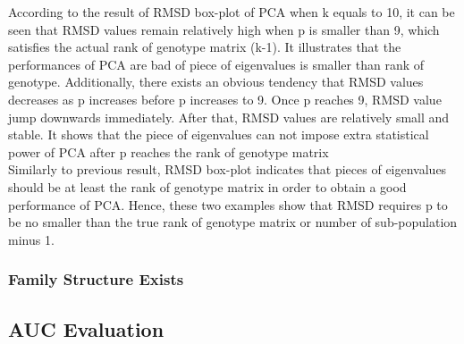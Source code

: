 \documentclass[12pt]{article}
\theoremstyle{definition}
\theoremstyle{plain}
\begin{document}
According to the result of RMSD box-plot of PCA when k equals to 10, it can be seen that RMSD values remain relatively high when p is smaller than 9, which satisfies the actual rank of genotype matrix (k-1). It illustrates that the performances of PCA are bad of piece of eigenvalues is smaller than rank of genotype. Additionally, there exists an obvious tendency that RMSD values decreases as p increases before p increases to 9. Once p reaches 9, RMSD value jump downwards immediately. After that, RMSD values are relatively small and stable. It shows that the piece of eigenvalues can not impose extra statistical power of PCA after p reaches the rank of genotype matrix\\

Similarly to previous result, RMSD box-plot indicates that pieces of eigenvalues should be at least the rank of genotype matrix in order to obtain a good performance of PCA. Hence, these two examples show that RMSD requires p to be no smaller than the true rank of genotype matrix or number of sub-population minus 1.
\subsubsection{Family Structure Exists}


\subsection{AUC Evaluation}
\end{document}
